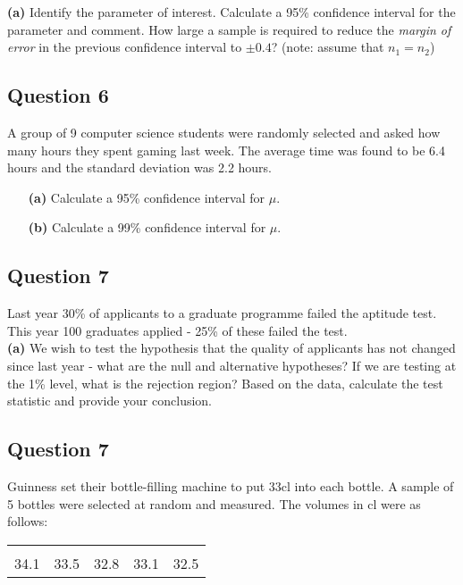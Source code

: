 {\bf(a)} Identify the parameter of interest.  Calculate a 95\% confidence interval for the parameter and comment.  How large a sample is required to reduce the \emph{margin of error} in the previous confidence interval to $\pm 0.4$? (note: assume that $n_1 = n_2$)




\subsection*{Question 6}
A group of 9 computer science students were randomly selected and asked how many hours they spent gaming last week. The average time was found to be 6.4 hours and the standard deviation was 2.2 hours.
\begin{itemize}
\item[{\bf(a)}] Calculate a 95\% confidence interval for $\mu$. \item[{\bf(b)}] Calculate a 99\% confidence interval for $\mu$.
\end{itemize}






\subsection*{Question 7}
Last year 30\% of applicants to a graduate programme failed the aptitude test. This year 100 graduates applied - 25\% of these failed the test.\\[-0.2cm]

{\bf(a)} We wish to test the hypothesis that the quality of applicants has not changed since last year - what are the null and alternative hypotheses?  If we are testing at the 1\% level, what is the rejection region?  Based on the data, calculate the test statistic and provide your conclusion.





\subsection*{Question 7}
Guinness set their bottle-filling machine to put 33cl into each bottle. A sample of 5 bottles were selected at random and measured. The volumes in cl were as follows:\\[-0.2cm]
\begin{center}
\begin{tabular}{|ccccc|}
\hline
&&&&\\[-0.3cm]
34.1  & 33.5 & 32.8 & 33.1 & 32.5\\[0.1cm]
\hline
\end{tabular}
\end{center}



